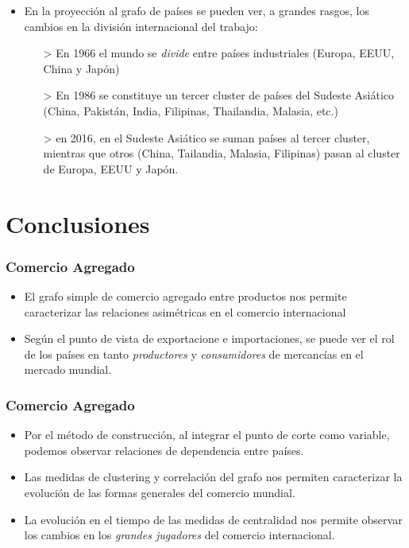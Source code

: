 \documentclass[compress]{beamer}
\begin{document}
\begin{frame}
\begin{itemize}[label=\faRebel]
	\item En la proyección al grafo de países se pueden ver, a grandes rasgos, los cambios en la división internacional del trabajo: 
	\begin{itemize}
		\item[>] En 1966 el mundo se \textit{divide} entre países industriales (Europa, EEUU, China y Japón)
		\item[>] En 1986 se constituye un tercer cluster de países del Sudeste Asiático (China, Pakistán, India, Filipinas, Thailandia, Malasia, etc.)
		\item[>] en 2016, en el Sudeste Asiático se suman países al tercer cluster, mientras que otros (China, Tailandia, Malasia, Filipinas) pasan al cluster de Europa, EEUU y Japón.
	\end{itemize}
	
\end{itemize}
\end{frame}

\section{Conclusiones}

\small

\begin{frame}
\frametitle{Comercio Agregado}
\begin{itemize}[label=\faRebel]
	\item El grafo simple de comercio agregado entre productos nos permite caracterizar las relaciones asimétricas en el comercio internacional
	\item Según el punto de vista de exportacione e importaciones, se puede ver el rol de los países en tanto \textit{productores} y \textit{consumidores} de mercancías en el mercado mundial. 
\end{itemize}
\end{frame}

\begin{frame}
\frametitle{Comercio Agregado}
\begin{itemize}[label=\faRebel]

	\item Por el método de construcción, al integrar el punto de corte como variable, podemos observar relaciones de dependencia entre países.
	\item Las medidas de clustering y correlación del grafo nos permiten caracterizar la evolución de las formas generales del comercio mundial.
	\item La evolución en el tiempo de las medidas de centralidad nos permite observar los cambios en los \textit{grandes jugadores} del comercio internacional.
	
\end{itemize}
\end{frame}
\end{document}
